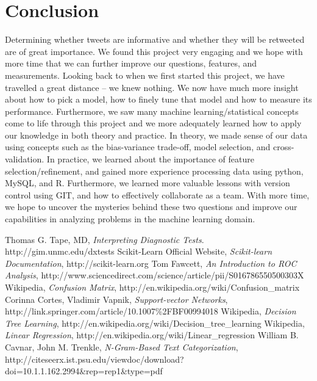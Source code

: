 \documentclass[12pt]{article}
\begin{document}
\section{Conclusion}
Determining whether tweets are informative and whether they will be retweeted are of great importance. We found this project very engaging and we hope with more time that we can further improve our questions, features, and measurements.  Looking back to when we first started this project, we have travelled a great distance -- we knew nothing. We now have much more insight about how to pick a model, how to finely tune that model and how to measure its performance. Furthermore, we saw many machine learning/statistical concepts come to life through this project and we more adequately learned how to apply our knowledge in both theory and practice. In theory, we made sense of our data using concepts such as the bias-variance trade-off, model selection, and cross-validation. In practice, we learned about the importance of feature selection/refinement, and gained more experience processing data using python, MySQL, and R. Furthermore, we learned more valuable lessons with version control using GIT, and how to effectively collaborate as a team. With more time, we hope to uncover the mysteries behind these two questions and improve our capabilities in analyzing problems in the machine learning domain.
\begin{thebibliography}{4}
    Thomas G. Tape, MD,
    \emph{Interpreting Diagnostic Tests}. 
    http://gim.unmc.edu/dxtests
    Scikit-Learn Official Website,
    \emph{Scikit-learn Documentation},
    http://scikit-learn.org
    Tom Fawcett,
    \emph{An Introduction to ROC Analysis},
    http://www.sciencedirect.com/science/article/pii/S016786550500303X
    Wikipedia,
    \emph{Confusion Matrix},
    http://en.wikipedia.org/wiki/Confusion\_matrix
    Corinna Cortes, Vladimir Vapnik,
    \emph{Support-vector Networks},
    http://link.springer.com/article/10.1007\%2FBF00994018
    Wikipedia,
    \emph{Decision Tree Learning},
    http://en.wikipedia.org/wiki/Decision\_tree\_learning
    Wikipedia,
    \emph{Linear Regression},
    http://en.wikipedia.org/wiki/Linear\_regression
    William B. Cavnar, John M. Trenkle,
    \emph{N-Gram-Based Text Categorization},
    http://citeseerx.ist.psu.edu/viewdoc/download?doi=10.1.1.162.2994&rep=rep1&type=pdf
\end{thebibliography}
\end{document}

